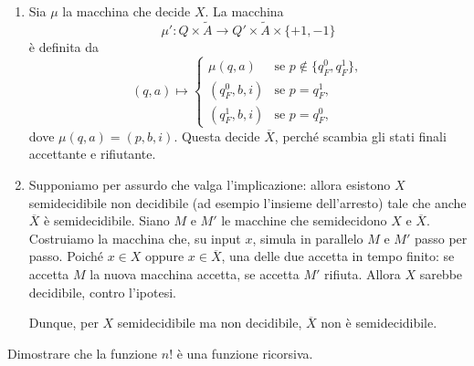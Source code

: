 \begin{sol}
\begin{enumerate}
    Per l'unione, invece, non si può aspettare che entrambe le simulazioni terminino: se $M_2$ cicla ma $M_1$ accetta, la macchina $\beta$ non si fermerebbe mai. Aggiungiamo quindi a $\beta$ la regola
    \[
    ((a,b),(p,q))\longmapsto ((a,b),Q_F^1,(0,0))\qquad\text{se } p=p_F^1 \text{ oppure } q=q_F^1,
    \]
    che ha la precedenza sulle altre. Se invece una delle due macchine entra in $q_{loop}$, l'altra continua la sua simulazione. Così $\beta$ accetta se e solo se almeno una delle due accetta.

    \item Sia $\mu$ la macchina che decide $X$. La macchina
    \[
    \mu'\colon Q\times\widetilde{A}\longrightarrow Q'\times\widetilde{A}\times\{+1,-1\}
    \]
    è definita da
    \[
    (q,a)\longmapsto
    \begin{cases}
    \mu(q,a) & \text{se } p\notin\{q_F^0,q_F^1\},\\
    (q_F^0,b,i) & \text{se } p=q_F^1,\\
    (q_F^1,b,i) & \text{se } p=q_F^0,
    \end{cases}
    \]
    dove $\mu(q,a)=(p,b,i)$. Questa decide $\overline{X}$, perché scambia gli stati finali accettante e rifiutante.

    \item Supponiamo per assurdo che valga l'implicazione: allora esistono $X$ semidecidibile non decidibile (ad esempio l'insieme dell'arresto) tale che anche $\overline{X}$ è semidecidibile. Siano $M$ e $M'$ le macchine che semidecidono $X$ e $\overline{X}$. Costruiamo la macchina che, su input $x$, simula in parallelo $M$ e $M'$ passo per passo. Poiché $x\in X$ oppure $x\in\overline{X}$, una delle due accetta in tempo finito: se accetta $M$ la nuova macchina accetta, se accetta $M'$ rifiuta. Allora $X$ sarebbe decidibile, contro l'ipotesi.

    Dunque, per $X$ semidecidibile ma non decidibile, $\overline{X}$ non è semidecidibile.
\end{enumerate}
\end{sol}

\newpage

\begin{ex}
Dimostrare che la funzione $n!$ è una funzione ricorsiva.
\end{ex}

